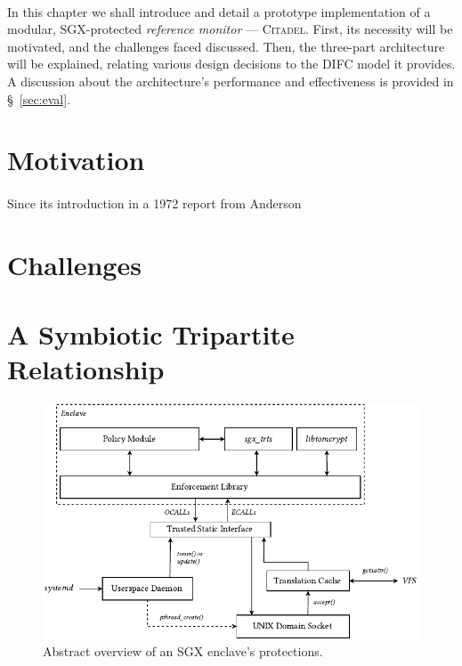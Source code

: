 

\paragraph{} In this chapter we shall introduce and detail a prototype implementation of a modular, SGX-protected \textit{reference monitor} --- \textsc{Citadel}. First, its necessity will be motivated, and the challenges faced discussed. Then, the three-part architecture will be explained, relating various design decisions to the DIFC model it provides. A discussion about the architecture's performance and effectiveness is provided in §~\ref{sec:eval}.

\section{Motivation}
\paragraph{} Since its introduction in a 1972 report from Anderson~\cite{reference-monitor}

\section{Challenges}

\section{A Symbiotic Tripartite Relationship}

\begin{figure}[]
    \centering
    \includegraphics[width=\linewidth]{figures/EnclaveLayout.pdf}
    \caption{Abstract overview of an SGX enclave's protections.}
    \label{fig:sgx-basic}
\end{figure}
